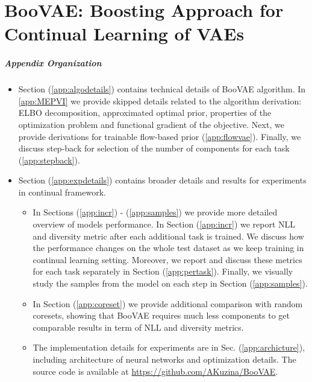 \newpage

\chapter{BooVAE: Boosting Approach for Continual Learning of VAEs} 


\paragraph{Appendix Organization}
\begin{itemize}
    \item Section (\ref{app:algodetails}) contains technical details of BooVAE algorithm. In \ref{app:MEPVI} we provide skipped details related to the algorithm derivation: ELBO decomposition, approximated optimal prior, properties of the optimization problem and functional gradient of the objective. Next, we provide derivations for trainable flow-based prior (\ref{app:flowvae}). Finally, we discuss step-back for selection of the number of components for each task (\ref{app:stepback}).
    \item Section (\ref{app:expdetails}) contains broader details and results for experiments in continual framework. 
    \begin{itemize}
        \item In Sections (\ref{app:incr}) - (\ref{app:samples}) we provide more detailed overview of models performance. In Section (\ref{app:incr}) we report NLL and diversity metric after each additional task is trained. We discuss how the performance changes on the whole test dataset as we keep training in continual learning setting. Moreover, we report and discuss these metrics for each task separately in Section (\ref{app:pertask}). Finally, we visually study the samples from the model on each step in Section (\ref{app:samples}). 
        \item In Section (\ref{app:coreset})  we provide additional comparison with random coresets, showing that BooVAE requires much less components to get comparable results in term of NLL and diversity metrics.
        \item The implementation details for experiments are in Sec. (\ref{app:archicture}), including architecture of neural networks and optimization details.
        The source code is available at \url{https://github.com/AKuzina/BooVAE}.
    \end{itemize}
    
\end{itemize}


